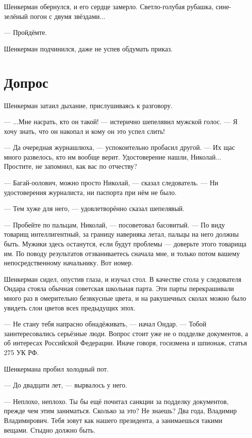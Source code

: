 \documentclass[a4paper,10pt,fleqn]{book}\usepackage{polyglossia}\setdefaultlanguage{english}\setotherlanguage{russian}\defaultfontfeatures{Ligatures=TeX,Mapping=tex-text} \usepackage{xcolor}\definecolor{lightgray}{HTML}{bbbbbb}\color{lightgray}\newcommand{\ml}[3]{\textcolor{black}{#3}}
\newcommand{\asterism}{\vspace{1em}{\centering\Large\bfseries$\ast~\ast~\ast$\par}\vspace{1em}}
\begin{document}
Шенкерман обернулся, и его сердце замерло.
Светло-голубая рубашка, сине-зелёный погон с двумя звёздами...

--- Пройдёмте.

Шенкерман подчинился, даже не успев обдумать приказ.

\section{Допрос}

Шенкерман затаил дыхание, прислушиваясь к разговору.

--- ...Мне насрать, кто он такой! --- истерично шепелявил мужской голос.
--- Я хочу знать, что он накопал и кому он это успел слить!

--- Да очередная журнашлюха, --- успокоительно пробасил другой.
--- Их щас много развелось, кто им вообще верит.
Удостоверение нашли, Николай...
Простите, не запомнил, как вас по отчеству?

--- Багай-оолович, можно просто Николай, --- сказал следователь.
--- Ни удостоверения журналиста, ни паспорта при нём не было.

--- Тем хуже для него, --- удовлетворённо сказал шепелявый.

--- Пробейте по пальцам, Николай, --- посоветовал басовитый.
--- По виду товарищ интеллигентный, за границу наверняка летал, пальцы на него должны быть.
Мужики здесь останутся, если будут проблемы --- доверьте этого товарища им.
По поводу результатов отзваниваетесь сначала мне, и только потом вашему непосредственному начальнику.
Вот номер.

\asterism

Шенкерман сидел, опустив глаза, и изучал стол.
В качестве стола у следователя Ондара стояла обычная советская школьная парта.
Эти парты перекрашивали много раз в омерительно безвкусные цвета, и на ракушечных сколах можно было увидеть слои цветов всех предыдущих эпох.

--- Не стану тебя напрасно обнадёживать, --- начал Ондар.
--- Тобой заинтересовались серьёзные люди.
Вопрос стоит уже не о подделке документов, а об интересах Российской Федерации.
Иначе говоря, госизмена и шпионаж, статья 275 УК РФ.

Шенкермана пробил холодный пот.

--- До двадцати лет, --- вырвалось у него.

--- Неплохо, неплохо.
Ты бы ещё почитал санкции за подделку документов, прежде чем этим заниматься.
Сколько за это?
Не знаешь?
Два года, Владимир Владимирович.
Тебя зовут как нашего президента, а занимаешься такими вещами.
Стыдно должно быть.
\end{document}
